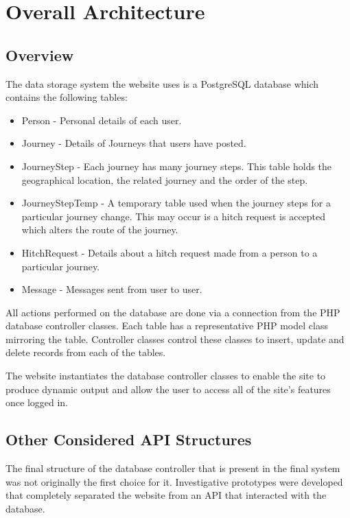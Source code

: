\section{Overall Architecture}
	\subsection{Overview}	
		The data storage system the website uses is a PostgreSQL database which contains the following tables:
		\begin{itemize}
		\item Person - Personal details of each user.
		\item Journey - Details of Journeys that users have posted.
		\item Journey\textunderscore Step - Each journey has many journey steps. This table holds the geographical location, the related journey and the order of the step.
		\item Journey\textunderscore Step\textunderscore Temp - A temporary table used when the journey steps for a particular journey change. This may occur is a hitch request is accepted which alters the route of the journey.
		\item Hitch\textunderscore Request - Details about a hitch request made from a person to a particular journey.
		\item Message - Messages sent from user to user.
		\end{itemize}
		
		All actions performed on the database are done via a connection from the PHP database controller classes. Each table has a representative PHP model class mirroring the table. Controller classes control these classes to insert, update and delete records from each of the tables.
		
		The website instantiates the database controller classes to enable the site to produce dynamic output and allow the user to access all of the site's features once logged in.
		
	\subsection{Other Considered API Structures}
		The final structure of the database controller that is present in the final system was not originally the first choice for it. Investigative prototypes were developed that completely separated the website from an API that interacted with the database. 
		
